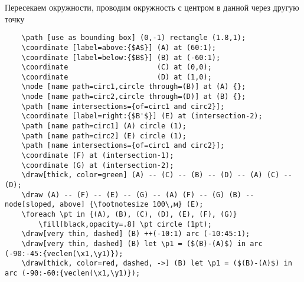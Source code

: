 \documentclass[a4paper,12pt]{article}
\begin{document}
Пересекаем окружности, проводим окружность с центром в данной через другую точку
{\footnotesize
\begin{verbatim}
    \path [use as bounding box] (0,-1) rectangle (1.8,1);
    \coordinate [label=above:{$A$}] (A) at (60:1);
    \coordinate [label=below:{$B$}] (B) at (-60:1);
    \coordinate                     (C) at (0,0);
    \coordinate                     (D) at (1,0);
    \node [name path=circ1,circle through=(B)] at (A) {};
    \node [name path=circ2,circle through=(D)] at (B) {};
    \path [name intersections={of=circ1 and circ2}];
    \coordinate [label=right:{$B'$}] (E) at (intersection-2);
    \path [name path=circ1] (A) circle (1);
    \path [name path=circ2] (E) circle (1);
    \path [name intersections={of=circ1 and circ2}];
    \coordinate (F) at (intersection-1);
    \coordinate (G) at (intersection-2);
    \draw[thick, color=green] (A) -- (C) -- (B) -- (D) -- (A) (C) -- (D);
    \draw (A) -- (F) -- (E) -- (G) -- (A) (F) -- (G) (B) -- node[sloped, above] {\footnotesize 100\,м} (E);
    \foreach \pt in {(A), (B), (C), (D), (E), (F), (G)}
        \fill[black,opacity=.8] \pt circle (1pt);
    \draw[very thin, dashed] (B) ++(-10:1) arc (-10:45:1);
    \draw[very thin, dashed] (B) let \p1 = ($(B)-(A)$) in arc (-90:-45:{veclen(\x1,\y1)});
    \draw[thick, color=red, dashed, ->] (B) let \p1 = ($(B)-(A)$) in arc (-90:-60:{veclen(\x1,\y1)});
\end{verbatim}

}
\end{document}

